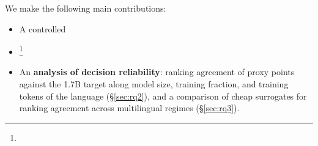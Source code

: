 We make the following main contributions:

\begin{itemize}[leftmargin=*,itemsep=0pt,topsep=0pt]
    \item A controlled 
    \item {}
    \footnote{}
    \item An \textbf{analysis of decision reliability}: ranking agreement of proxy points against the 1.7B target along model size, training fraction, and training tokens of the language (\S\ref{sec:rq2}), and a comparison of cheap surrogates for ranking agreement across multilingual regimes (\S\ref{sec:rq3}).
\end{itemize}